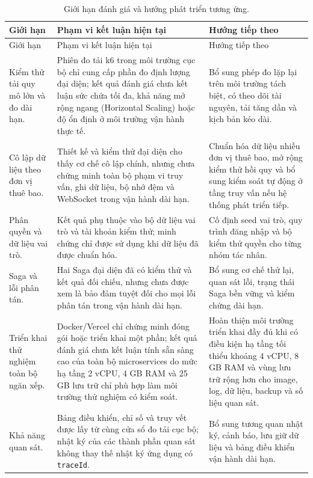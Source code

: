 {\scriptsize\sloppy
\setlength{\tabcolsep}{3pt}
\begin{longtable}{>{\raggedright\arraybackslash}p{}>{\raggedright\arraybackslash}p{}>{\raggedright\arraybackslash}p{}}
  \caption{Giới hạn đánh giá và hướng phát triển tương ứng.}
  \label{tab:chapter6-limitations}\\
  \toprule
  Giới hạn & Phạm vi kết luận hiện tại & Hướng tiếp theo \\
  \midrule
  \endfirsthead
  \toprule
  Giới hạn & Phạm vi kết luận hiện tại & Hướng tiếp theo \\
  \midrule
  \endhead
  \bottomrule
  \endfoot
  Kiểm thử tải quy mô lớn và đo dài hạn. & Phiên đo tải k6 trong môi trường cục bộ chỉ cung cấp phần đo định lượng đại diện; kết quả đánh giá chưa kết luận sức chứa tối đa, khả năng mở rộng ngang (Horizontal Scaling) hoặc độ ổn định ở môi trường vận hành thực tế. & Bổ sung phép đo lặp lại trên môi trường tách biệt, có theo dõi tài nguyên, tải tăng dần và kịch bản kéo dài. \\
  Cô lập dữ liệu theo đơn vị thuê bao. & Thiết kế và kiểm thử đại diện cho thấy cơ chế cô lập chính, nhưng chưa chứng minh toàn bộ phạm vi truy vấn, ghi dữ liệu, bộ nhớ đệm và WebSocket trong vận hành dài hạn. & Chuẩn hóa dữ liệu nhiều đơn vị thuê bao, mở rộng kiểm thử hồi quy và bổ sung kiểm soát tự động ở tầng truy vấn nếu hệ thống phát triển tiếp. \\
  Phân quyền và dữ liệu vai trò. & Kết quả phụ thuộc vào bộ dữ liệu vai trò và tài khoản kiểm thử; minh chứng chỉ được sử dụng khi dữ liệu đã được chuẩn hóa. & Cố định seed vai trò, quy trình đăng nhập và bộ kiểm thử quyền cho từng nhóm tác nhân. \\
  Saga và lỗi phân tán. & Hai Saga đại diện đã có kiểm thử và kết quả đối chiếu, nhưng chưa được xem là bảo đảm tuyệt đối cho mọi lỗi phân tán trong vận hành dài hạn. & Bổ sung cơ chế thử lại, quan sát lỗi, trạng thái Saga bền vững và kiểm chứng dài hạn. \\
  Triển khai thử nghiệm toàn bộ ngăn xếp. & Docker/Vercel chỉ chứng minh đóng gói hoặc triển khai một phần; kết quả đánh giá chưa kết luận tính sẵn sàng cao của toàn bộ microservices do mức hạ tầng 2 vCPU, 4 GB RAM và 25 GB lưu trữ chỉ phù hợp làm môi trường thử nghiệm có kiểm soát. & Hoàn thiện môi trường triển khai đầy đủ khi có điều kiện hạ tầng tối thiểu khoảng 4 vCPU, 8 GB RAM và vùng lưu trữ rộng hơn cho image, log, dữ liệu, backup và số liệu quan sát. \\
  Khả năng quan sát. & Bảng điều khiển, chỉ số và truy vết được lấy từ cùng cửa sổ đo tải cục bộ; nhật ký của các thành phần quan sát không thay thế nhật ký ứng dụng có \texttt{traceId}. & Bổ sung tương quan nhật ký, cảnh báo, lưu giữ dữ liệu và bảng điều khiển vận hành dài hạn. \\

\end{longtable}}
